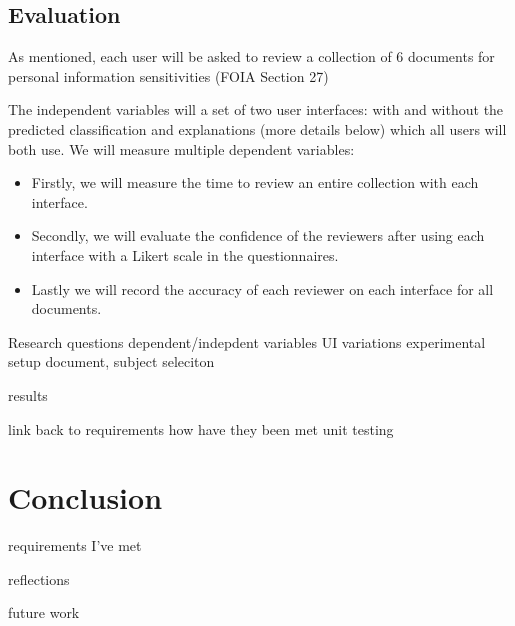 \documentclass{l4proj}
\begin{document}
\section{Evaluation}

As mentioned, each user will be asked to review a collection of 6 documents for personal information sensitivities (FOIA Section 27)

The independent variables will a set of two user interfaces: with and without the predicted classification and explanations (more details below) which all users will both use. We will measure multiple dependent variables:

\begin{itemize}
    \item Firstly, we will measure the time to review an entire collection with each interface.
    \item Secondly, we will evaluate the confidence of the reviewers after using each interface with a Likert scale in the questionnaires.
    \item Lastly we will record the accuracy of each reviewer on each interface for all documents.
\end{itemize}




Research questions
dependent/indepdent variables
UI variations
experimental setup
document, subject seleciton


results


link back to requirements 
how have they been met
unit testing




\chapter{Conclusion}


requirements I've met


reflections 

future work

%
% 
\end{document}
